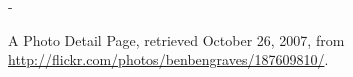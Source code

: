 \begin{figure}
\begin{adjustwidth*}{0em}{-\wholemargin}
\begin{minipage}[t]{0.475\wholewidth}
      \caption[Flickr Photo Detail Page]{%
         A Photo Detail Page,
         retrieved October 26, 2007, from
         \url{http://flickr.com/photos/benbengraves/187609810/}.}
      \label{figure:scrsh.flickr.photo.detail}
    \end{minipage}
  \end{adjustwidth*}
  \normalcaption
\end{figure}
